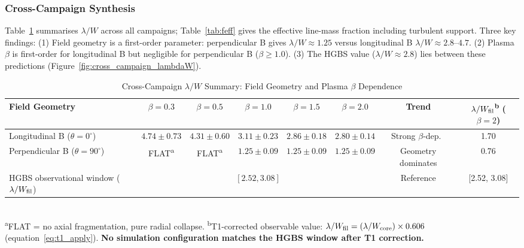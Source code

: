 \documentclass[twoside,twocolumn]{mnras}
\begin{document}
\subsubsection{Cross-Campaign Synthesis}

Table~\ref{tab:cross_campaign} summarises $\lambda/W$ across all campaigns; Table~\ref{tab:feff}
gives the effective line-mass fraction including turbulent support. Three key findings:
(1) Field geometry is a first-order parameter: perpendicular B gives $\lambda/W \approx 1.25$
versus longitudinal B $\lambda/W \approx 2.8$--$4.7$. (2) Plasma $\beta$ is first-order
for longitudinal B but negligible for perpendicular B ($\beta \geq 1.0$).
(3) The HGBS value ($\lambda/W \approx 2.8$) lies between these predictions
(Figure~\ref{fig:cross_campaign_lambdaW}).

\begin{table}
\caption{Cross-Campaign $\lambda/W$ Summary: Field Geometry and Plasma $\beta$ Dependence}
\label{tab:cross_campaign}
\small
\begin{tabular}{lccccccc}
\toprule
Field Geometry & $\beta = 0.3$ & $\beta = 0.5$ & $\beta = 1.0$ & $\beta = 1.5$ & $\beta = 2.0$ & Trend & $\lambda/W_{\rm fil}$\textsuperscript{b} ($\beta=2$) \\
\midrule
Longitudinal B ($\theta = 0^\circ$) & $4.74 \pm 0.73$ & $4.31 \pm 0.60$ & $3.11 \pm 0.23$ & $2.86 \pm 0.18$ & $2.80 \pm 0.14$ & Strong $\beta$-dep.\ & 1.70 \\
Perpendicular B ($\theta = 90^\circ$) & FLAT\textsuperscript{a} & FLAT\textsuperscript{a} & $1.25 \pm 0.09$ & $1.25 \pm 0.09$ & $1.25 \pm 0.09$ & Geometry dominates & 0.76 \\
\midrule
HGBS observational window ($\lambda/W_{\rm fil}$) & \multicolumn{5}{c}{$[2.52, 3.08]$} & Reference & [2.52, 3.08] \\
\bottomrule
\end{tabular}
\\[2pt]
\footnotesize
\textsuperscript{a}FLAT = no axial fragmentation, pure radial collapse. \hspace{1em}
\textsuperscript{b}T1-corrected observable value: $\lambda/W_{\rm fil} = (\lambda/W_{\rm core}) \times 0.606$ (equation~\ref{eq:t1_apply}). \textbf{No simulation configuration matches the HGBS window after T1 correction.}
\end{table}
\end{document}
